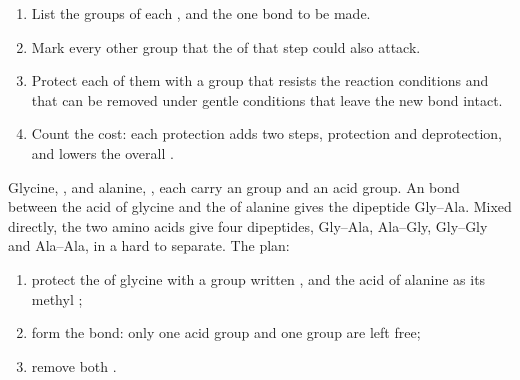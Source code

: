 \begin{method}\label{met:g12:synthesis-strategy:plan}
\begin{enumerate}
  \item List the groups of each , and the one bond to be made.
  \item Mark every other group that the  of that step could also
        attack.
  \item Protect each of them with a group that resists the reaction
        conditions and that can be removed under gentle conditions that
        leave the new bond intact.
  \item Count the cost: each protection adds two steps, protection and
        deprotection, and lowers the overall .
\end{enumerate}
\end{method}

\begin{example}\label{ex:g12:synthesis-strategy:dipeptide}
Glycine, , and alanine, , each carry
an  group and an acid group. An  bond between the acid of
glycine and the  of alanine gives the dipeptide Gly--Ala. Mixed
directly, the two amino acids give four dipeptides, Gly--Ala, Ala--Gly,
Gly--Gly and Ala--Ala, in a  hard to separate. The plan:
\begin{enumerate}
  \item protect the  of glycine with a group written , and the
        acid of alanine as its methyl ;
  \item form the  bond: only one acid group and one  group are
        left free;
  \item remove both .
\end{enumerate}
\end{example}

